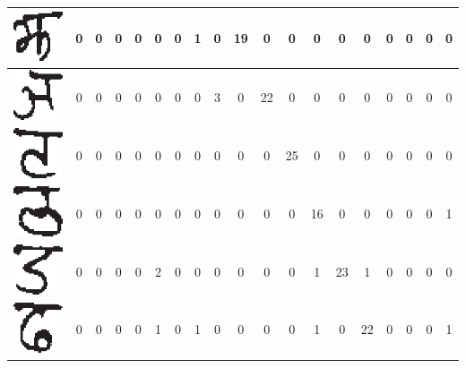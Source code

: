 \begin{table}[h]
\begin{tabular}{|c|c|c|c|c|c|c|c|c|c|c|c|c|c|c|c|c|c|c|}
\hline
\includegraphics[scale=0.25]{figures/datasets/nhcr/consonants/9jha} & 0 & 0 & 0 & 0 & 0 & 0 & 1 & 0 & 19 & 0 & 0 & 0 & 0 & 0 & 0 & 0 & 0 & 0\tabularnewline
\hline
\includegraphics[scale=0.25]{figures/datasets/nhcr/consonants/10yna} & 0 & 0 & 0 & 0 & 0 & 0 & 0 & 3 & 0 & 22 & 0 & 0 & 0 & 0 & 0 & 0 & 0 & 0\tabularnewline
\hline
\includegraphics[scale=0.25]{figures/datasets/nhcr/consonants/11ta} & 0 & 0 & 0 & 0 & 0 & 0 & 0 & 0 & 0 & 0 & 25 & 0 & 0 & 0 & 0 & 0 & 0 & 0\tabularnewline
\hline
\includegraphics[scale=0.25]{figures/datasets/nhcr/consonants/12tha} & 0 & 0 & 0 & 0 & 0 & 0 & 0 & 0 & 0 & 0 & 0 & 16 & 0 & 0 & 0 & 0 & 0 & 1\tabularnewline
\hline
\includegraphics[scale=0.25]{figures/datasets/nhcr/consonants/13da} & 0 & 0 & 0 & 0 & 2 & 0 & 0 & 0 & 0 & 0 & 0 & 1 & 23 & 1 & 0 & 0 & 0 & 0\tabularnewline
\hline
\includegraphics[scale=0.25]{figures/datasets/nhcr/consonants/14dha} & 0 & 0 & 0 & 0 & 1 & 0 & 1 & 0 & 0 & 0 & 0 & 1 & 0 & 22 & 0 & 0 & 0 & 1\tabularnewline

\end{tabular}
\end{table}
